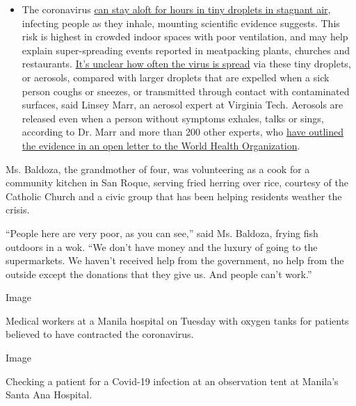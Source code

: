 \begin{itemize}
  \begin{itemize}
  \tightlist
  \item
    The coronavirus
    \href{https://www.nytimes.com/2020/07/04/health/239-experts-with-one-big-claim-the-coronavirus-is-airborne.html?action=click\&pgtype=Article\&state=default\&region=MAIN_CONTENT_3\&context=storylines_faq}{can
    stay aloft for hours in tiny droplets in stagnant air}, infecting
    people as they inhale, mounting scientific evidence suggests. This
    risk is highest in crowded indoor spaces with poor ventilation, and
    may help explain super-spreading events reported in meatpacking
    plants, churches and restaurants.
    \href{https://www.nytimes.com/2020/07/06/health/coronavirus-airborne-aerosols.html?action=click\&pgtype=Article\&state=default\&region=MAIN_CONTENT_3\&context=storylines_faq}{It's
    unclear how often the virus is spread} via these tiny droplets, or
    aerosols, compared with larger droplets that are expelled when a
    sick person coughs or sneezes, or transmitted through contact with
    contaminated surfaces, said Linsey Marr, an aerosol expert at
    Virginia Tech. Aerosols are released even when a person without
    symptoms exhales, talks or sings, according to Dr. Marr and more
    than 200 other experts, who
    \href{https://academic.oup.com/cid/article/doi/10.1093/cid/ciaa939/5867798}{have
    outlined the evidence in an open letter to the World Health
    Organization}.
  \end{itemize}
\end{itemize}

Ms. Baldoza, the grandmother of four, was volunteering as a cook for a
community kitchen in San Roque, serving fried herring over rice,
courtesy of the Catholic Church and a civic group that has been helping
residents weather the crisis.

``People here are very poor, as you can see,'' said Ms. Baldoza, frying
fish outdoors in a wok. ``We don't have money and the luxury of going to
the supermarkets. We haven't received help from the government, no help
from the outside except the donations that they give us. And people
can't work.''

Image

Medical workers at a Manila hospital on Tuesday with oxygen tanks for
patients believed to have contracted the coronavirus.

Image

Checking a patient for a Covid-19 infection at an observation tent at
Manila's Santa Ana Hospital.

